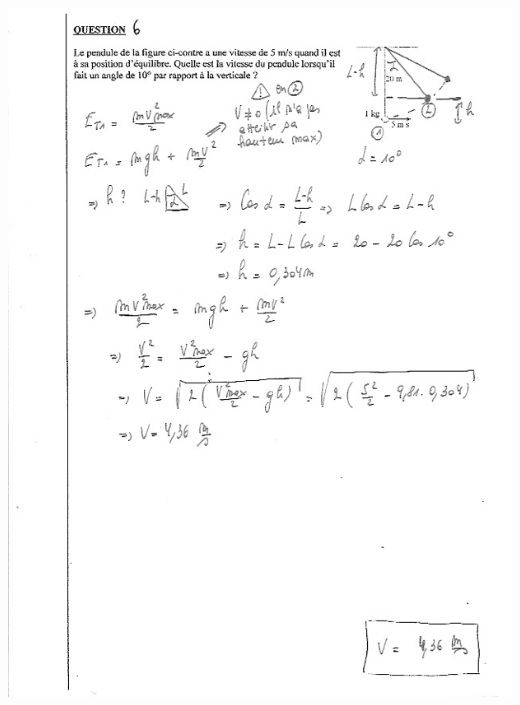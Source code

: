 \includegraphics[width=17.498cm,height=23.941cm]{Pictures/100000010000026400000345CD11555FB30FBF68.png}
